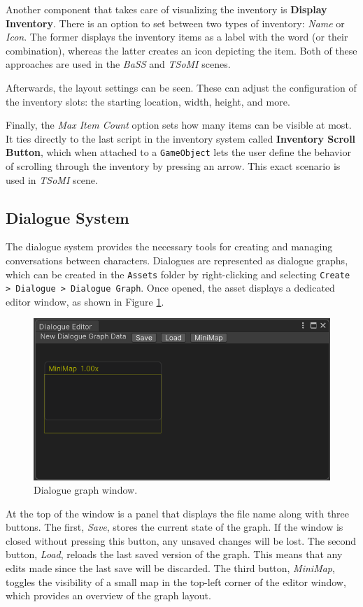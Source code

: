 Another component that takes care of visualizing the inventory is \textbf{Display Inventory}. There is an option to set between two types of inventory: \textit{Name} or \textit{Icon}. The former displays the inventory items as a label with the word (or their combination), whereas the latter creates an icon depicting the item. Both of these approaches are used in the \textit{BaSS} and \textit{TSoMI} scenes.

Afterwards, the layout settings can be seen. These can adjust the configuration of the inventory slots: the starting location, width, height, and more. 

Finally, the \textit{Max Item Count} option sets how many items can be visible at most. It ties directly to the last script in the inventory system called \textbf{Inventory Scroll Button}, which when attached to a \verb|GameObject| lets the user define the behavior of scrolling through the inventory by pressing an arrow. This exact scenario is used in \textit{TSoMI} scene.

\subsection{Dialogue System}
\label{Manual:DS}
The dialogue system provides the necessary tools for creating and managing conversations between characters. Dialogues are represented as dialogue graphs, which can be created in the \verb|Assets| folder by right-clicking and selecting \verb|Create > Dialogue > Dialogue Graph|. Once opened, the asset displays a dedicated editor window, as shown in Figure \ref{fig:Manual-DW}.

\begin{figure}[H]
\centering
\includegraphics[width=0.8\linewidth]{img/User doc/image_2025-07-04_123651622.png}
\caption{Dialogue graph window.}
\label{fig:Manual-DW}
\end{figure}

At the top of the window is a panel that displays the file name along with three buttons. The first, \textit{Save}, stores the current state of the graph. If the window is closed without pressing this button, any unsaved changes will be lost. The second button, \textit{Load}, reloads the last saved version of the graph. This means that any edits made since the last save will be discarded. The third button, \textit{MiniMap}, toggles the visibility of a small map in the top-left corner of the editor window, which provides an overview of the graph layout.

